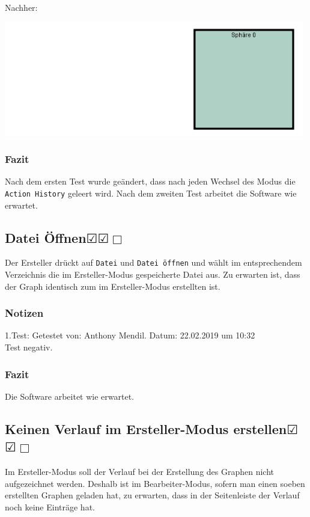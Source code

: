 \documentclass{scrartcl}
\newcommand{\subsectiont}[2]{\subsection[#1]{#1{\normalsize\normalfont #2}}}
\newcommand{\leer}{$\Box$}
\newcommand{\ok}{$\CheckedBox$}
\begin{document}
Nachher: 
\begin{center}
\includegraphics[height=5cm]{2_1vorher.PNG}
\end{center}
\subsubsection{Fazit}
Nach dem ersten Test wurde geändert, dass nach jeden Wechsel des Modus die \texttt{Action History} geleert wird.
Nach dem zweiten Test arbeitet die Software wie erwartet. 

\subsectiont{Datei Öffnen}{\dotfill\ok\ok\leer}
Der Ersteller drückt auf \texttt{Datei} und \texttt{Datei öffnen} und wählt im entsprechendem Verzeichnis die im Ersteller-Modus gespeicherte Datei aus. Zu erwarten ist, dass der Graph identisch zum im Ersteller-Modus erstellten ist. 
\subsubsection{Notizen}
1.Test: Getestet von: Anthony Mendil. Datum: 22.02.2019 um 10:32 \\
Test negativ.
\subsubsection{Fazit}
Die Software arbeitet wie erwartet.

\subsectiont{Keinen Verlauf im Ersteller-Modus erstellen}{\dotfill\ok\ok\leer}
Im Ersteller-Modus soll der Verlauf bei der Erstellung des Graphen nicht aufgezeichnet werden. Deshalb ist im Bearbeiter-Modus, sofern man einen soeben erstellten Graphen geladen hat, zu erwarten, dass in der Seitenleiste der Verlauf noch keine Einträge hat. 
\end{document}
